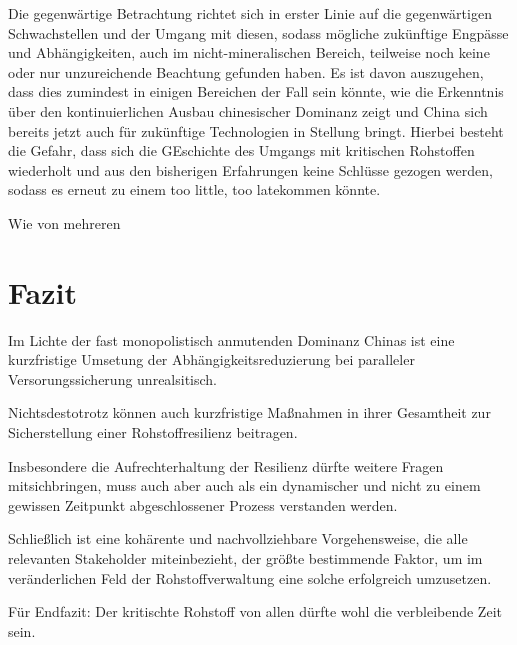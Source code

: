 \documentclass[12pt,a4paper,oneside]{book} %
\begin{document}
Die gegenwärtige Betrachtung richtet sich in erster Linie auf die gegenwärtigen Schwachstellen und der Umgang mit diesen, sodass mögliche zukünftige Engpässe und Abhängigkeiten, auch im nicht-mineralischen Bereich, teilweise noch keine oder nur unzureichende Beachtung gefunden haben. Es ist davon auszugehen, dass dies zumindest in einigen Bereichen der Fall sein könnte, wie die Erkenntnis über den kontinuierlichen Ausbau chinesischer Dominanz zeigt und China sich bereits jetzt auch für zukünftige Technologien \glqq in Stellung bringt\grq. Hierbei besteht die Gefahr, dass sich die GEschichte des Umgangs mit kritischen Rohstoffen wiederholt und aus den bisherigen Erfahrungen keine Schlüsse gezogen werden, sodass es erneut zu einem \glqq too little, too late\grqq kommen könnte.



Wie von mehreren 


\section{Fazit}

Im Lichte der fast monopolistisch anmutenden Dominanz Chinas ist eine kurzfristige Umsetung der Abhängigkeitsreduzierung bei paralleler Versorungssicherung unrealsitisch.


Nichtsdestotrotz können auch kurzfristige Maßnahmen in ihrer Gesamtheit zur Sicherstellung einer Rohstoffresilienz beitragen.

Insbesondere die Aufrechterhaltung der Resilienz dürfte weitere Fragen mitsichbringen, muss auch aber auch als ein dynamischer und nicht zu einem gewissen Zeitpunkt abgeschlossener Prozess verstanden werden.

Schließlich ist eine kohärente und nachvollziehbare Vorgehensweise, die alle relevanten Stakeholder miteinbezieht, der größte bestimmende Faktor, um im veränderlichen Feld der Rohstoffverwaltung eine solche erfolgreich umzusetzen.

Für Endfazit: Der kritischte Rohstoff von allen dürfte wohl die verbleibende Zeit sein.

	
\end{document}
